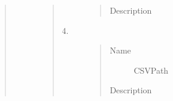 \documentclass[letterpaper,10pt,english]{sphinxmanual}
\begin{document}
\begin{quote}
\begin{description}
\begin{quote}
\begin{description}
\begin{quote}
\begin{description}
\item[{Description}] \leavevmode
{}

\end{description}\end{quote}

\item[{4.}] \leavevmode\begin{quote}\begin{description}
\item[{Name}] \leavevmode
CSVPath

\item[{Description}] \leavevmode
{}

\end{description}\end{quote}

\end{description}\end{quote}

\end{description}\end{quote}
\end{document}
